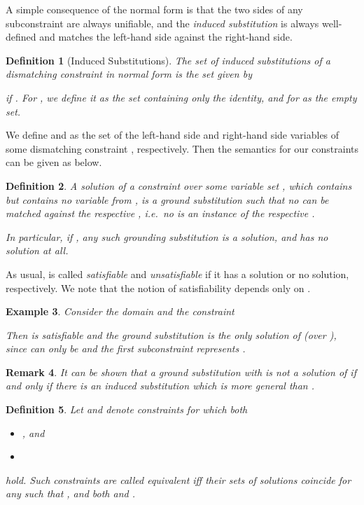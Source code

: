 \documentclass[a4paper]{article}
\newtheorem{defi}{Definition}[section]
\newtheorem{remark}[defi]{Remark}
\newtheorem{example}[defi]{Example}
\begin{document}
A simple consequence of the normal form is that the two sides of any subconstraint  are 
always unifiable, and the \emph{induced substitution}  is always well-defined and 
matches the left-hand side against the right-hand side.

\begin{defi}[Induced Substitutions]
The \emph{set of induced substitutions} of a dismatching constraint  in normal form is the set given by

if . For , we define 
it as the set containing only the identity, and for  as the empty set.
\end{defi}

We define  and  as the set of the left-hand side and right-hand side variables of some dismatching constraint , respectively. 
Then the semantics for our constraints can be given as below.

\begin{defi}
A \emph{solution} of a constraint  over some variable set , which contains  but contains no variable from , 
is a ground substitution  such that 
no  can be matched against the respective , i.e.\
no  is an instance of the respective .

In particular, if , any such grounding substitution is a solution, and  has no solution at all.
\end{defi}

\noindent
As usual,  is called \emph{satisfiable} and \emph{unsatisfiable} if it has a solution or no solution, respectively. 
We note that the notion of satisfiability depends only on .

\begin{example} Consider the domain  and the constraint 

Then  is satisfiable and the ground substitution  
is the only solution of  (over ), since  can only be  and the first 
subconstraint represents .
\end{example}

\begin{remark}\label{a-inducedsubst-remark}
It can be shown that a ground substitution  with  
is not a solution of  
if and only if there is an induced substitution  which is more general than .
\end{remark}

\begin{defi}
Let  and  denote constraints for which both
\begin{itemize}
\item , and
\item  
\end{itemize}
hold.
Such constraints are called \emph{equivalent} iff their sets of solutions coincide for any  such that 
, and both
 and 
.
\end{defi}
\end{document}
